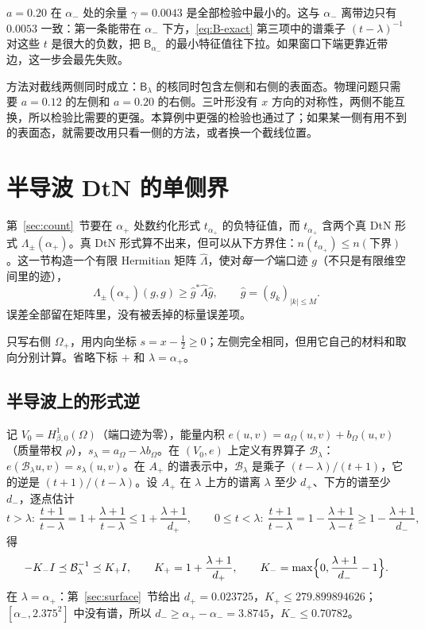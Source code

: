 \documentclass[11pt,a4paper,fontset=fandol]{ctexart}
\begin{document}
\begin{remark}
$a=0.20$ 在 $\alpha_-$ 处的余量 $\gamma=0.0043$ 是全部检验中最小的。这与 $\alpha_-$ 离带边只有 $0.0053$ 一致：第一条能带在 $\alpha_-$ 下方，\eqref{eq:B-exact} 第三项中的谱乘子 $(t-\lambda)^{-1}$ 对这些 $t$ 是很大的负数，把 $\mathsf B_{\alpha_-}$ 的最小特征值往下拉。如果窗口下端更靠近带边，这一步会最先失败。
\end{remark}

\begin{remark}[两侧同时检验的代价]
方法对截线两侧同时成立：$\mathsf B_\lambda$ 的核同时包含左侧和右侧的表面态。物理问题只需要 $a=0.12$ 的左侧和 $a=0.20$ 的右侧。三叶形没有 $x$ 方向的对称性，两侧不能互换，所以检验比需要的更强。本算例中更强的检验也通过了；如果某一侧有用不到的表面态，就需要改用只看一侧的方法，或者换一个截线位置。
\end{remark}

\section{半导波 DtN 的单侧界}
\label{sec:dtnbound}
第~\ref{sec:count}~节要在 $\alpha_+$ 处数约化形式 $t_{\alpha_+}$ 的负特征值，而 $t_{\alpha_+}$ 含两个真 DtN 形式 $\Lambda_\pm(\alpha_+)$。真 DtN 形式算不出来，但可以从下方界住：$n(t_{\alpha_+})\le n(\text{下界})$。这一节构造一个有限 Hermitian 矩阵 $\hat\Lambda$，使对\emph{每一个}端口迹 $g$（不只是有限维空间里的迹），
\[
\Lambda_\pm(\alpha_+)(g,g)\ge\hat g^*\hat\Lambda\hat g,\qquad \hat g=(g_k)_{|k|\le M}.
\]
误差全部留在矩阵里，没有被丢掉的标量误差项。

只写右侧 $\Omega_+$，用内向坐标 $s=x-\tfrac12\ge0$；左侧完全相同，但用它自己的材料和取向分别计算。省略下标 $+$ 和 $\lambda=\alpha_+$。

\subsection{半导波上的形式逆}

记 $V_0=H^1_{\beta,0}(\Omega)$（端口迹为零），能量内积 $e(u,v)=a_\Omega(u,v)+b_\Omega(u,v)$（质量带权 $\rho$），$s_\lambda=a_\Omega-\lambda b_\Omega$。在 $(V_0,e)$ 上定义有界算子 $\mathcal B_\lambda$：$e(\mathcal B_\lambda u,v)=s_\lambda(u,v)$。在 $A_+$ 的谱表示中，$\mathcal B_\lambda$ 是乘子 $(t-\lambda)/(t+1)$，它的逆是 $(t+1)/(t-\lambda)$。设 $A_+$ 在 $\lambda$ 上方的谱离 $\lambda$ 至少 $d_+$、下方的谱至少 $d_-$，逐点估计
\[
t>\lambda:\ \frac{t+1}{t-\lambda}=1+\frac{\lambda+1}{t-\lambda}\le1+\frac{\lambda+1}{d_+},\qquad
0\le t<\lambda:\ \frac{t+1}{t-\lambda}=1-\frac{\lambda+1}{\lambda-t}\ge1-\frac{\lambda+1}{d_-},
\]
得
\begin{equation}
\label{eq:Kpm}
-K_-I\preceq\mathcal B_\lambda^{-1}\preceq K_+I,\qquad K_+=1+\frac{\lambda+1}{d_+},\qquad K_-=\max\Bigl\{0,\frac{\lambda+1}{d_-}-1\Bigr\}.
\end{equation}
在 $\lambda=\alpha_+$：第~\ref{sec:surface}~节给出 $d_+=0.023725$，$K_+\le279.899894626$；$[\alpha_-,2.375^2]$ 中没有谱，所以 $d_-\ge\alpha_+-\alpha_-=3.8745$，$K_-\le0.70782$。
\end{document}
